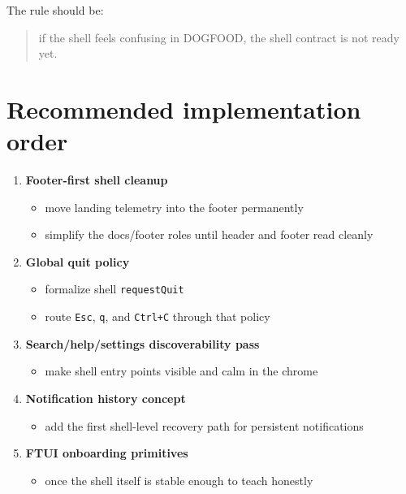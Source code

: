 The rule should be:

\begin{quote}
if the shell feels confusing in DOGFOOD, the shell contract is not ready yet.
\end{quote}

\section{Recommended implementation order}\label{record-047-recommended-implementation-order}

\begin{enumerate}
\def\labelenumi{\arabic{enumi}.}
\tightlist
\item
  \textbf{Footer-first shell cleanup}

  \begin{itemize}
  \tightlist
  \item
    move landing telemetry into the footer permanently
  \item
    simplify the docs/footer roles until header and footer read cleanly
  \end{itemize}
\item
  \textbf{Global quit policy}

  \begin{itemize}
  \tightlist
  \item
    formalize shell \texttt{r\allowbreak{}e\allowbreak{}q\allowbreak{}u\allowbreak{}e\allowbreak{}s\allowbreak{}t\allowbreak{}Q\allowbreak{}u\allowbreak{}i\allowbreak{}t}
  \item
    route \texttt{E\allowbreak{}s\allowbreak{}c}, \texttt{q}, and \texttt{C\allowbreak{}t\allowbreak{}r\allowbreak{}l\allowbreak{}+\allowbreak{}C} through that policy
  \end{itemize}
\item
  \textbf{Search/help/settings discoverability pass}

  \begin{itemize}
  \tightlist
  \item
    make shell entry points visible and calm in the chrome
  \end{itemize}
\item
  \textbf{Notification history concept}

  \begin{itemize}
  \tightlist
  \item
    add the first shell-level recovery path for persistent notifications
  \end{itemize}
\item
  \textbf{FTUI onboarding primitives}

  \begin{itemize}
  \tightlist
  \item
    once the shell itself is stable enough to teach honestly
  \end{itemize}
\end{enumerate}

